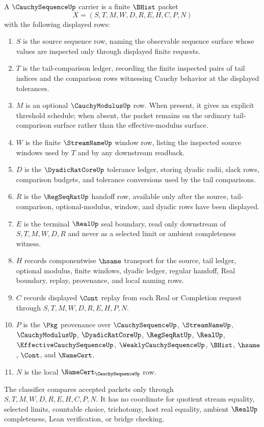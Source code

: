 \begin{definition}
\label{def:cauchy-sequence-carrier}
A $\CauchySequenceUp$ carrier is a finite $\BHist$ packet
$$
X=(S,T,M,W,D,R,E,H,C,P,N)
$$
with the following displayed rows:
\begin{enumerate}
\item $S$ is the source sequence row, naming the observable sequence surface whose values are inspected only through displayed finite requests.
\item $T$ is the tail-comparison ledger, recording the finite inspected pairs of tail indices and the comparison rows witnessing Cauchy behavior at the displayed tolerances.
\item $M$ is an optional $\CauchyModulusUp$ row. When present, it gives an explicit threshold schedule; when absent, the packet remains on the ordinary tail-comparison surface rather than the effective-modulus surface.
\item $W$ is the finite $\StreamNameUp$ window row, listing the inspected source windows used by $T$ and by any downstream readback.
\item $D$ is the $\DyadicRatCoreUp$ tolerance ledger, storing dyadic radii, slack rows, comparison budgets, and tolerance conversions used by the tail comparisons.
\item $R$ is the $\RegSeqRatUp$ handoff row, available only after the source, tail-comparison, optional-modulus, window, and dyadic rows have been displayed.
\item $E$ is the terminal $\RealUp$ seal boundary, read only downstream of $S,T,M,W,D,R$ and never as a selected limit or ambient completeness witness.
\item $H$ records componentwise $\hsame$ transport for the source, tail ledger, optional modulus, finite windows, dyadic ledger, regular handoff, Real boundary, replay, provenance, and local naming rows.
\item $C$ records displayed $\Cont$ replay from each Real or Completion request through $S,T,M,W,D,R,E,H,P,N$.
\item $P$ is the $\Pkg$ provenance over $\CauchySequenceUp$, $\StreamNameUp$, $\CauchyModulusUp$, $\DyadicRatCoreUp$, $\RegSeqRatUp$, $\RealUp$, $\EffectiveCauchySequenceUp$, $\WeaklyCauchySequenceUp$, $\BHist$, $\hsame$, $\Cont$, and $\NameCert$.
\item $N$ is the local $\NameCert_{\CauchySequenceUp}$ row.
\end{enumerate}
The classifier compares accepted packets only through $S,T,M,W,D,R,E,H,C,P,N$. It has no coordinate for quotient stream equality, selected limits, countable choice, trichotomy, host real equality, ambient $\RealUp$ completeness, Lean verification, or bridge checking.
\end{definition}

